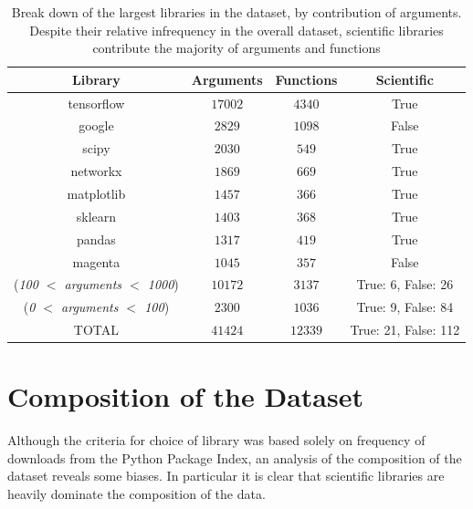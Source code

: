 \begin{table}[h!]
    \begin{center}
    \begin{tabular}{c | c | c | c}
        Library      & Arguments     & Functions  & Scientific \\
    \hline
        tensorflow   & $ 17002 $     & $ 4340 $ & True \\
        google   & $ 2829 $      & $ 1098 $ & False \\
        scipy    & $ 2030 $      & $ 549 $ & True \\
        networkx     & $ 1869 $      & $ 669 $ & True \\
        matplotlib   & $ 1457 $      & $ 366 $ & True \\
        sklearn      & $ 1403 $      & $ 368 $ & True \\
        pandas   & $ 1317 $      & $ 419 $ & True \\
        magenta      & $ 1045 $      & $ 357 $ & False \\
        (\textit{100 $<$ arguments $<$ 1000})   & $ 10172 $     & $ 3137 $ & True: 6, False: 26 \\
        (\textit{0 $<$ arguments $<$ 100})      & $ 2300 $      & $ 1036 $ & True: 9, False: 84 \\
    \hline
    \hline
        TOTAL    & $ 41424 $     & $ 12339 $ & True: 21, False: 112 \\
    \end{tabular}
    \caption {Break down of the largest libraries in the dataset, by contribution of arguments. Despite their relative infrequency in the overall dataset, scientific libraries contribute the majority of arguments and functions}
    \label{table:breakdown_by_library}
    \end{center}
\end{table}

\section{Composition of the Dataset} %
\label{sec:composition_of_the_dataset}

Although the criteria for choice of library was based solely on frequency of downloads from the Python Package Index, an analysis of the composition of the dataset reveals some biases.
In particular it is clear that scientific libraries are heavily dominate the composition of the data.

